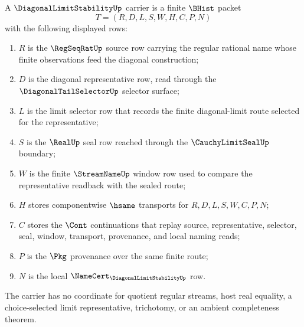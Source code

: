 \begin{definition}
\label{def:diagonal-limit-stability-carrier}
A $\DiagonalLimitStabilityUp$ carrier is a finite $\BHist$ packet
$$
T=(R,D,L,S,W,H,C,P,N)
$$
with the following displayed rows:
\begin{enumerate}
\item $R$ is the $\RegSeqRatUp$ source row carrying the regular rational name whose finite observations feed the diagonal construction;
\item $D$ is the diagonal representative row, read through the $\DiagonalTailSelectorUp$ selector surface;
\item $L$ is the limit selector row that records the finite diagonal-limit route selected for the representative;
\item $S$ is the $\RealUp$ seal row reached through the $\CauchyLimitSealUp$ boundary;
\item $W$ is the finite $\StreamNameUp$ window row used to compare the representative readback with the sealed route;
\item $H$ stores componentwise $\hsame$ transports for $R,D,L,S,W,C,P,N$;
\item $C$ stores the $\Cont$ continuations that replay source, representative, selector, seal, window, transport, provenance, and local naming reads;
\item $P$ is the $\Pkg$ provenance over the same finite route;
\item $N$ is the local $\NameCert_{\DiagonalLimitStabilityUp}$ row.
\end{enumerate}
The carrier has no coordinate for quotient regular streams, host real equality, a choice-selected limit representative, trichotomy, or an ambient completeness theorem.
\end{definition}

